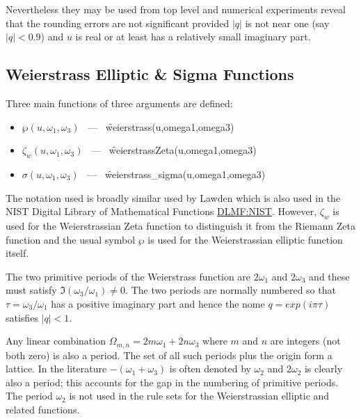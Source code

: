 Nevertheless they may be used from top level and numerical experiments reveal that the rounding
errors are not significant provided $|q|$ is not near one (say $|q|<0.9$)
and $u$ is real or at least has a relatively small imaginary part.

\subsection{Weierstrass Elliptic \& Sigma Functions}
Three main functions of three arguments are defined:
\hypertarget{WEIERSTRASS}{}
\hypertarget{WEIERSTRASSZETA}{}
\hypertarget{SIGMA}{}
\hypertarget{operator:WEIERSTRASS_SIGMA}{}
\hypertarget{operator:WEIERSTRASS}{}
\hypertarget{operator:WEIERSTRASSZETA}{}
 
\begin{itemize}
\item  $\wp(u, \omega_1, \omega_3)$ \ --- \ \f{weierstrass(u,omega1,omega3)}
\item $\zeta_w(u, \omega_1, \omega_3)$ \ --- \ \f{weierstrassZeta(u,omega1,omega3)}
\item $\sigma(u, \omega_1, \omega_3)$ \ --- \ \f{weierstrass\_sigma(u,omega1,omega3)}
\end{itemize}

The notation used is broadly similar used by Lawden \cite{Lawden:89} which is also used in the
NIST Digital Library of Mathematical Functions \href{https://dlmf.nist.gov/}{DLMF:NIST}. However,
$\zeta_w$ is used for the Weierstrassian Zeta function to distinguish it from the Riemann Zeta
function and the usual symbol $\wp$ is used for the Weierstrassian elliptic function itself.

The two primitive periods of the Weierstrass function are $2\omega_1$ and $2\omega_3$ and these must satisfy
$\Im(\omega_3/\omega_1) \neq 0$. The two periods are normally numbered so that $\tau = \omega_3/\omega_1$ has
a positive imaginary part and hence the nome $q = exp(i\pi\tau)$ satisfies $|q| <1$.

Any linear combination $\Omega_{m,n} = 2m\omega_1 +2n\omega_3$ where $m$ and $n$ are
integers (not both zero) is also a period. The set of all such periods plus the origin form a lattice. In the literature
$-(\omega_1+\omega_3)$ is often denoted by $\omega_2$ and $2\omega_2$ is clearly also a period; this
accounts for the gap in the numbering of primitive periods. The period $\omega_2$ is not used in \REDUCE the rule sets for
the Weierstrassian elliptic and related functions.

